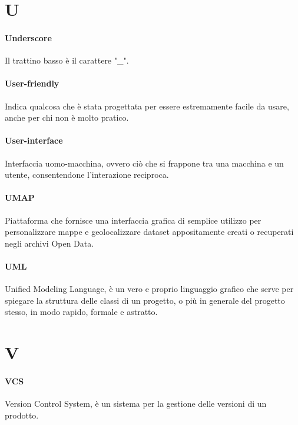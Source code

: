 \documentclass[]{article}
\begin{document}
	\section*{U}
	
	\paragraph*{Underscore}
	Il trattino basso è il carattere "\_".
	
	\paragraph*{User-friendly}
	Indica qualcosa che è stata progettata per essere estremamente facile da usare, anche per chi non è molto pratico.
	
	\paragraph*{User-interface}
	Interfaccia uomo-macchina, ovvero ciò che si frappone tra una macchina e un utente, consentendone l'interazione reciproca.
	
	\paragraph*{UMAP}
	Piattaforma che fornisce una interfaccia grafica di semplice utilizzo per personalizzare mappe e geolocalizzare dataset appositamente creati o recuperati negli archivi Open Data.
	
	\paragraph*{UML}
	Unified Modeling Language, è un vero e proprio linguaggio grafico che serve per spiegare la struttura delle classi di un progetto, o più in generale del progetto stesso, in modo rapido, formale e astratto.
		
	\newpage
	
	\section*{V}
	
	\paragraph*{VCS}
	Version Control System, è un sistema per la gestione delle versioni di un prodotto.
	
\end{document}
